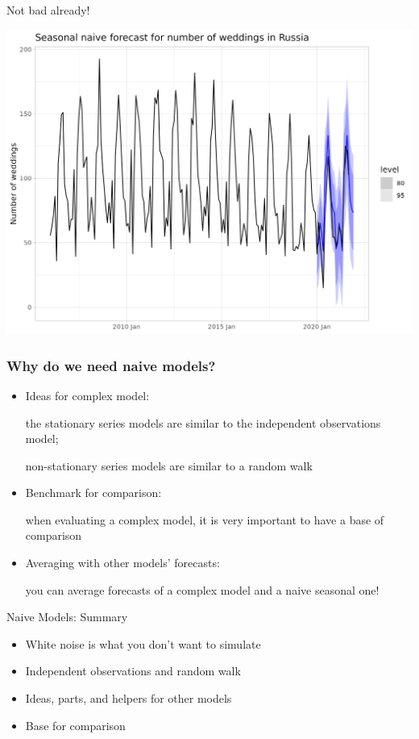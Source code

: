 \begin{frame}{Not bad already!}
	
	\includegraphics[width=\textwidth]{pictures/om_ts_01-162.png}
	
	
\end{frame}


\begin{frame}
	\frametitle{Why do we need naive models?}
	
	\begin{itemize}[<+->]
		\item \alert{Ideas} for complex model:
		
		the \alert{stationary series} models are similar to the independent observations model;
		
		\alert{non-stationary series} models are similar to a random walk
		
		\item \alert{Benchmark for comparison}:
		
		when evaluating a complex model, it is very important to have a base of comparison
		
		\item \alert{Averaging} with other models' forecasts:
		
		you can \alert{average forecasts} of a complex model and a naive seasonal one!
	\end{itemize}
	
	
\end{frame}

\begin{frame}{Naive Models: Summary}
	
	\begin{itemize}[<+->]
		\item White noise is what you don't want to simulate
		\item Independent observations and random walk
		\item Ideas, parts, and helpers for other models
		\item Base for comparison
	\end{itemize}
\end{frame}